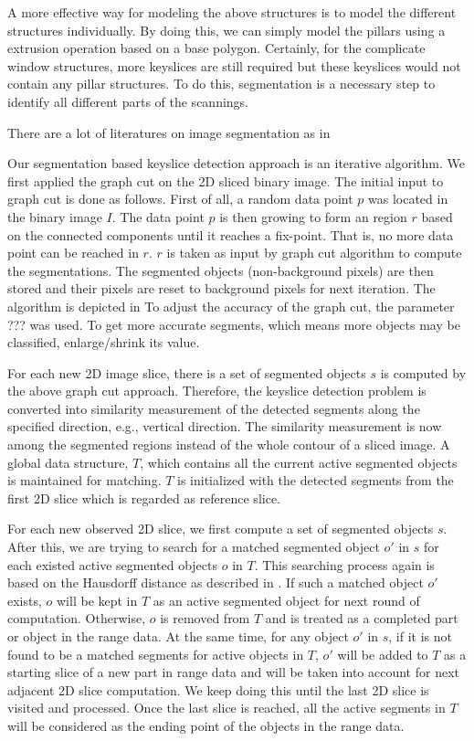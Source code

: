 A more effective way for modeling the above structures is to model the different 
structures individually. By doing this, we can simply model the pillars using a
extrusion operation based on a base polygon. Certainly, for the complicate window
structures, more keyslices are still required but these keyslices would not contain
any pillar structures. To do this, segmentation is a necessary step to identify
all different parts of the scannings. 

There are a lot of literatures on image segmentation as in %

Our segmentation based keyslice detection approach is an iterative algorithm.
We first applied the graph cut
on the 2D sliced binary image. The initial input to graph cut is done as follows. 
First of all, a random data point $p$ was located in the binary image $I$. The data
point $p$ is then growing to form an region $r$ based on the connected components 
until it reaches a fix-point. That is, no more data point can be reached in $r$. $r$
is taken as input by graph cut algorithm to compute the segmentations. 
The segmented objects (non-background pixels) are then stored and their pixels are 
reset to background pixels for next iteration. The algorithm is depicted in %
To adjust the accuracy of the graph cut, the parameter ??? was used. To get more
accurate segments, which means more objects may be classified, enlarge/shrink its value.

For each new 2D image slice, there is a set of segmented objects $s$ is computed
by the above graph cut approach. Therefore, the keyslice detection problem is converted
into similarity measurement of the detected segments along the specified direction, 
e.g., vertical direction.
The similarity measurement is now among the segmented regions instead of the whole
contour of a sliced image. A global data structure, $T$, which contains all the current 
active segmented objects is maintained for matching. $T$ is initialized with the
detected segments from the first 2D slice which is regarded as reference slice. 

For each new observed 2D slice, we first compute a set of segmented objects $s$. 
After this, we are trying to search for a matched segmented object $o'$ in $s$ for 
each existed active segmented objects $o$ in $T$. This searching process again is 
based on the Hausdorff distance as described in . If such a matched object $o'$
exists, $o$ will be kept in $T$ as an active segmented object for next round of
computation. Otherwise, $o$ is removed from $T$ and is treated as a completed part or
object in the range data. At the same time, for any object $o'$ in $s$, if it is 
not found to be a matched segments for active objects in $T$, $o'$ will be added
to $T$ as a starting slice of a new part in range data and will be taken into
account for next adjacent 2D slice computation. We keep doing this until the last
2D slice is visited and processed. Once the last slice is reached, all the active
segments in $T$ will be considered as the ending point of the objects in the range data.


